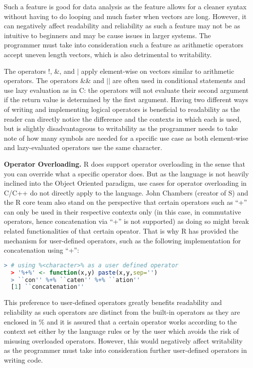 \documentclass[12pt]{article}
\begin{document}
Such a feature is good for data analysis as the feature allows for a cleaner syntax without having to do looping and much faster when vectors are long. However, it can negatively affect readability and reliability as such a feature may not be as intuitive to beginners and may be cause issues in larger systems. The programmer must take into consideration such a feature as arithmetic operators accept uneven length vectors, which is also detrimental to writability.

The operators !, \&, and \(|\) apply element-wise on vectors similar to arithmetic operators. The operators \&\& and \(||\) are often used in conditional statements and use lazy evaluation as in C: the operators will not evaluate their second argument if the return value is determined by the first argument. Having two different ways of writing and implementing logical operators is beneficial to readability as the reader can directly notice the difference and the contexts in which each is used, but is slightly disadvantageous to writability as the programmer needs to take note of how many symbols are needed for a specific use case as both element-wise and lazy-evaluated operators use the same character.

\textbf{Operator Overloading.}
R does support operator overloading in the sense that you can override what a specific operator does. But as the language is not heavily inclined into the Object Oriented paradigm, use cases for operator overloading in C/C++ do not directly apply to the language. John Chambers (creator of S) and the R core team also stand on the perspective that certain operators such as ``+'' can only be used in their respective contexts only (in this case, in commutative operators, hence concatenation via ``+'' is not supported) as doing so might break related functionalities of that certain opeator. That is why R has provided the mechanism for user-defined operators, such as the following implementation for concatenation using ``+'':

\begin{lstlisting}[language=R ]
  > # using %<character>% as a user defined operator
  > '%+%' <- function(x,y) paste(x,y,sep='')
  > ``con'' %+% ``caten'' %+% ``ation''
  [1] ``concatenation''
\end{lstlisting}

  This preference to user-defined operators greatly benefits readability and reliability as such operators are distinct from the built-in operators as they are enclosed in \% and it is assured that a certain operator works according to the context set either by the language rules or by the user which avoids the risk of misusing overloaded operators. However, this would negatively affect writability as the programmer must take into consideration further user-defined operators in writing code.
\end{document}
